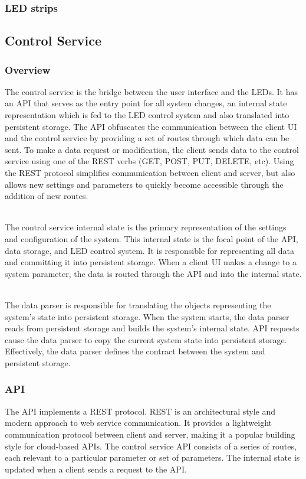\documentclass[onecolumn, draftclsnofoot,10pt, compsoc]{IEEEtran}
\begin{document}
			\subsubsection{LED strips}


		\subsection{Control Service}
			\subsubsection{Overview}
			The control service is the bridge between the user interface and the LEDs.
			It has an API that serves as the entry point for all system changes, an internal state representation which is fed to the LED control system and also translated into persistent storage.
			The API obfuscates the communication between the client UI and the control service by providing a set of routes through which data can be sent.
			To make a data request or modification, the client sends data to the control service using one of the REST verbs (GET, POST, PUT, DELETE, etc).
			Using the REST protocol simplifies communication between client and server, but also allows new settings and parameters to quickly become accessible through the addition of new routes.

			\noindent \\The control service internal state is the primary representation of the settings and configuration of the system.
			This internal state is the focal point of the API, data storage, and LED control system.
			It is responsible for representing all data and committing it into persistent storage.
			When a client UI makes a change to a system parameter, the data is routed through the API and into the internal state.

			\noindent \\The data parser is responsible for translating the objects representing the system's state into persistent storage.
			When the system starts, the data parser reads from persistent storage and builds the system's internal state.
			API requests cause the data parser to copy the current system state into persistent storage.
			Effectively, the data parser defines the contract between the system and persistent storage.

			\subsubsection{API}
			The API implements a REST protocol. REST is an architectural style and modern approach to web service communication. \cite{rest1}
			It provides a lightweight communication protocol between client and server, making it a popular building style for cloud-based APIs.
			The control service API consists of a series of routes, each relevant to a particular parameter or set of parameters.
			The internal state is updated when a client sends a request to the API.
\end{document}
